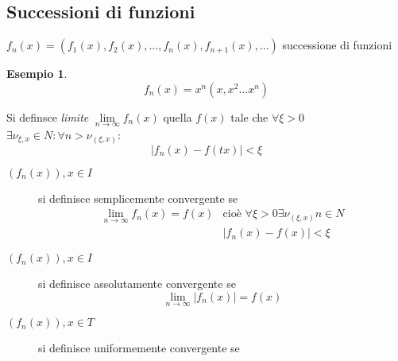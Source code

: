 \documentclass{book}
\newtheorem{esempio}{Esempio}
\newcommand{\abs}[1]{\lvert#1\rvert}
\begin{document}
\subsection{Successioni di funzioni}
$f_n(x)=(f_1(x),f_2(x),\dots,f_n(x),f_{n+1}(x),\dots)$ {\color{red}successione di
  funzioni}
\begin{esempio}
  \begin{equation*}
    f_n(x)=x^n(x,x^2\dots x^n)
  \end{equation*}
\end{esempio}
Si definsce \textit{\color{red}limite} $\lim\limits_{n\to\infty}f_n(x)$ quella $f(x)$ tale
che $\forall \xi >0$ $\exists \nu_{\xi,x}\in N:\forall n >\nu_{(\xi,x)}$:
\begin{equation*}
  \abs{f_n(x)-f(tx)}<\xi
\end{equation*}
\begin{description}
\item[$(f_n(x)),x\in I$] si definisce {\color{red}semplicemente convergente} se
  \begin{eqnarray*}
    \lim\limits_{n\to \infty}f_n(x)=f(x) & \text{cioè } \forall \xi > 0 \exists
                                           \nu_{(\xi,x)} n\in N\\
    & \abs{f_n(x)-f(x)}<\xi
  \end{eqnarray*}
\item[$(f_n(x)), x\in I$] si definisce {\color{red}assolutamente convergente} se
  \begin{equation*}
    \lim\limits_{n\to \infty}\abs{f_n(x)}=f(x)
  \end{equation*}
  \item[$(f_n(x)),x\in T$] si definisce {\color{red}uniformemente convergente} se
\end{description}

\printindex
\end{document}
